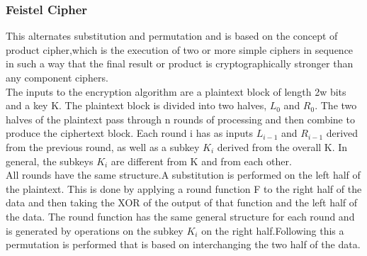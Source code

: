\documentclass{article}
\begin{document}
\subsubsection{Feistel Cipher}
This alternates substitution and permutation and is based on the concept of product cipher,which is the execution of two or more simple ciphers in sequence in such a way that the final result or product is cryptographically stronger than any component ciphers.\\
The inputs to the encryption algorithm are a plaintext block of length 2w bits and a key K. The plaintext block is divided into two halves, $L_0$ and $R_0$. The two halves of the plaintext pass through n rounds of processing and then combine to produce the ciphertext block. Each round i has as inputs $L_{i - 1}$ and $R_{i - 1}$ derived from the previous round, as well as a subkey $K_i$ derived from the overall K. In general, the subkeys $K_i$ are different from K and from each other.\\
All rounds have the same structure.A substitution is performed on the left half of the plaintext. This is done by applying a round function F to the right half of the data and then taking the XOR of the output of that function and the left half of the data. The round function has the same general structure for each round and is generated by operations on the subkey $K_i$ on the right half.Following this a permutation is performed that is based on interchanging the two half of the data.\\
\end{document}
